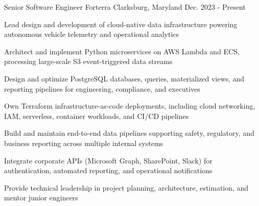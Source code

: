 

\begin{cventries}


\cventry
{Senior Software Engineer} %
{Forterra} %
{Clarksburg, Maryland} %
{Dec. 2023 - Present} %
{
  \begin{cvitems} %
    \item {Lead design and development of cloud-native data infrastructure powering autonomous vehicle telemetry and operational analytics}
    \item {Architect and implement Python microservices on AWS Lambda and ECS, processing large-scale S3 event-triggered data streams}
    \item {Design and optimize PostgreSQL databases, queries, materialized views, and reporting pipelines for engineering, compliance, and executives}
    \item {Own Terraform infrastructure-as-code deployments, including cloud networking, IAM, serverless, container workloads, and CI/CD pipelines}
    \item {Build and maintain end-to-end data pipelines supporting safety, regulatory, and business reporting across multiple internal systems}
    \item {Integrate corporate APIs (Microsoft Graph, SharePoint, Slack) for authentication, automated reporting, and operational notifications}
    \item {Provide technical leadership in project planning, architecture, estimation, and mentor junior engineers}

\end{cvitems}}
\end{cventries}
